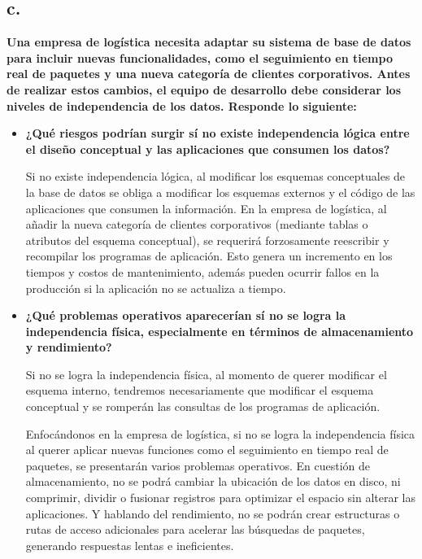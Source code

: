 \subsection*{c.}
\textbf{Una empresa de logística necesita adaptar su sistema de base de datos para incluir nuevas
funcionalidades, como el seguimiento en tiempo real de paquetes y una nueva categoría de
clientes corporativos. Antes de realizar estos cambios, el equipo de desarrollo debe considerar los
niveles de independencia de los datos. Responde lo siguiente:}

\begin{itemize}
    \item \textbf{¿Qué riesgos podrían surgir sí no existe independencia lógica entre el diseño conceptual y las aplicaciones que consumen los datos?}

    Si no existe independencia lógica, al modificar los esquemas conceptuales de la base de datos se obliga a modificar los esquemas externos y el código de las aplicaciones que consumen la información. En la empresa de logística, al añadir la nueva categoría de clientes corporativos (mediante tablas o atributos del esquema conceptual), se requerirá forzosamente reescribir y recompilar los programas de aplicación. Esto genera un incremento en los tiempos y costos de mantenimiento, además pueden ocurrir fallos en la producción si la aplicación no se actualiza a tiempo.
    
    \item \textbf{¿Qué problemas operativos aparecerían sí no se logra la independencia física, especialmente en términos de almacenamiento y rendimiento?}
    
    Si no se logra la independencia física, al momento de querer modificar el esquema interno, tendremos necesariamente que modificar el esquema conceptual y se romperán las consultas de los programas de aplicación.

    Enfocándonos en la empresa de logística, si no se logra la independencia física al querer aplicar nuevas funciones como el seguimiento en tiempo real de paquetes, se presentarán varios problemas operativos. En cuestión de almacenamiento, no se podrá cambiar la ubicación de los datos en disco, ni comprimir, dividir o fusionar registros para optimizar el espacio sin alterar las aplicaciones. Y hablando del rendimiento, no se podrán crear estructuras o rutas de acceso adicionales para acelerar las búsquedas de paquetes, generando respuestas lentas e ineficientes.
    

\end{itemize}
